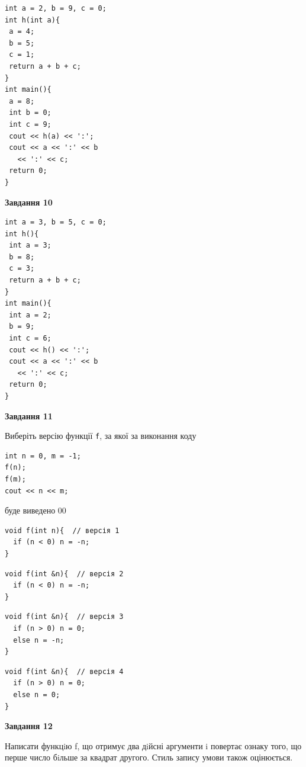 \documentclass[12pt, ukrainian]{article}
\def\code#1{\Verb!#1!}
\begin{document}
{\begin {large}
\begin{minipage}[t]{7.0cm}
\begin{verbatim}
int a = 2, b = 9, c = 0;
int h(int a){
 a = 4;
 b = 5;
 c = 1;
 return a + b + c;
}
int main(){
 a = 8;
 int b = 0;
 int c = 9;
 cout << h(a) << ':';
 cout << a << ':' << b 
   << ':' << c;
 return 0;
}
\end{verbatim}



\begin{center}
\textbf{Завдання 10}
\end{center}
\vspace{-8mm}

\begin{verbatim}
int a = 3, b = 5, c = 0;
int h(){
 int a = 3;
 b = 8;
 c = 3;
 return a + b + c;
}
int main(){
 int a = 2;
 b = 9;
 int c = 6;
 cout << h() << ':';
 cout << a << ':' << b 
   << ':' << c;
 return 0;
}
\end{verbatim}

\end{minipage}
\vline \hspace{1mm}
\begin{minipage}[t]{11.0cm}

\begin{center}
\textbf{Завдання 11}
\end{center}
Виберіть версію функції \code{f}, за якої за виконання коду
\begin{verbatim}
int n = 0, m = -1;
f(n);
f(m);
cout << n << m;
\end{verbatim}

буде виведено 00

\begin{verbatim}
void f(int n){  // версія 1
  if (n < 0) n = -n;
}
\end{verbatim}

\vspace{-8mm}\begin{verbatim}
void f(int &n){  // версія 2
  if (n < 0) n = -n;
}
\end{verbatim}

\vspace{-8mm}\begin{verbatim}
void f(int &n){  // версія 3
  if (n > 0) n = 0;
  else n = -n;
}
\end{verbatim}

\vspace{-8mm}\begin{verbatim}
void f(int &n){  // версія 4
  if (n > 0) n = 0;
  else n = 0;
}
\end{verbatim}



\begin{center}
\textbf{Завдання 12}
\end{center}

Написати функцiю f, що отримує два дiйсні аргументи i повертає ознаку того, що перше число бiльше за квадрат другого. Стиль запису умови також оцінюється.\par

\end{minipage}

\end {large}}
\newpage
\end{document}
